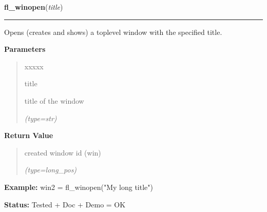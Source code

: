 \hspace{.8\funcindent}\begin{boxedminipage}{\funcwidth}

    \raggedright \textbf{fl\_winopen}(\textit{title})

    \vspace{-1.5ex}

    \rule{\textwidth}{0.5\fboxrule}
\setlength{\parskip}{2ex}
    Opens (creates and shows) a toplevel window with the specified title.

\setlength{\parskip}{1ex}
      \textbf{Parameters}
      \vspace{-1ex}

      \begin{quote}
        \begin{Ventry}{xxxxx}

          \item[title]

          title of the window

            {\it (type=str)}

        \end{Ventry}

      \end{quote}

      \textbf{Return Value}
    \vspace{-1ex}

      \begin{quote}
      created window id (win)

      {\it (type=long\_pos)}

      \end{quote}

\textbf{Example:} win2 = fl\_winopen("My long title")



\textbf{Status:} Tested + Doc + Demo = OK



    \end{boxedminipage}

    \label{xformslib:flxbasic:fl_winhide}

    \vspace{0.5ex}

